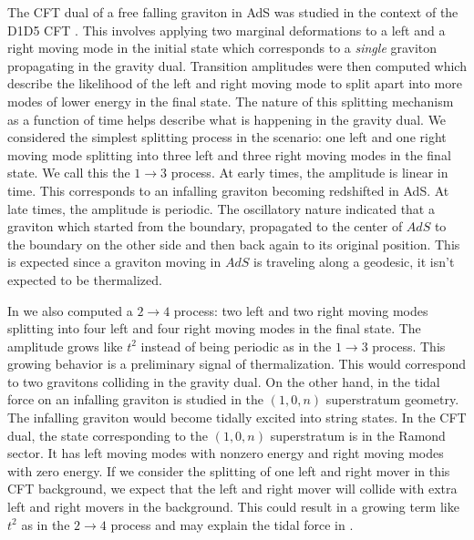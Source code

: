 \documentclass[11pt]{article}
\begin{document}
The CFT dual of a free falling graviton in AdS was studied in the context of the D1D5 CFT \cite{hm,dissertation,Guo:2021ybz}. This involves applying two marginal deformations to a left and a right moving mode in the initial state which corresponds to a \textit{single} graviton propagating in the gravity dual. Transition amplitudes were then computed which describe the likelihood of the left and right moving mode to split apart into more modes of lower energy in the final state. The nature of this splitting mechanism as a function of time helps describe what is happening in the gravity dual. We considered the simplest splitting process in the scenario: one left and one right moving mode splitting into three left and three right moving modes in the final state. We call this the $1\to 3$ process. At early times, the amplitude is linear in time.
This corresponds to an infalling graviton becoming redshifted in AdS.
At late times, the amplitude is periodic. The oscillatory nature indicated that a graviton which started from the boundary, propagated to the center of $AdS$ to the boundary on the other side and then back again to its original position. This is expected since a graviton moving in $AdS$ is traveling along a geodesic, it isn't expected to be thermalized.

In \cite{hm,dissertation} we also computed a $2\to 4$ process: two left and two right moving modes splitting into four left and four right moving modes in the final state.
The amplitude grows like $t^2$ instead of being periodic as in the $1\to 3$ process. 
This growing behavior is a preliminary signal of thermalization. 
This would correspond to two gravitons colliding in the gravity dual. 
On the other hand, in \cite{mw} the tidal force on an infalling graviton is studied in the $(1,0,n)$ superstratum geometry. The infalling graviton would become tidally excited into string states. In the CFT dual, the state corresponding to the $(1,0,n)$ superstratum is in the Ramond sector. It has left moving modes with nonzero energy and right moving modes with zero energy. If we consider the splitting of one left and right mover in this CFT background, we expect that the left and right mover will collide with extra left and right movers in the background. This could result in a growing term like $t^2$ as in the  $2\to 4$ process and may explain the tidal force in \cite{mw}. 
\end{document}
